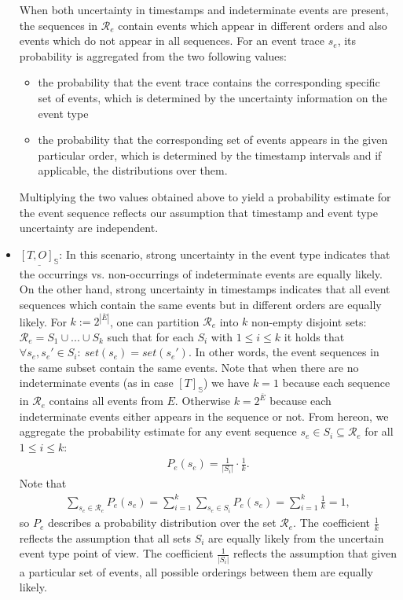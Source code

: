 \begin{itemize}
%
%
%
%
When both uncertainty in timestamps and indeterminate events are present, the sequences in $\mathcal{R}_e$ contain events which appear in different orders and also events which do not appear in all sequences.
For an event trace $s_e$, its probability is aggregated from the two following values:
\begin{itemize}
\item the probability that the event trace contains the corresponding specific set of events, which is determined by the uncertainty information on the event type 
\item the probability that the corresponding set of events appears in the given particular order, which is determined by the timestamp intervals and if applicable, the distributions over them. 
\end{itemize}
Multiplying the two values obtained above to yield a probability estimate for the event sequence reflects our assumption that timestamp and event type uncertainty are independent.


\item
$\underline{[T,O]_{\mathbb{S}}}$:
In this scenario, strong uncertainty in the event type indicates that the occurrings vs. non-occurrings of indeterminate events are equally likely.
On the other hand, strong uncertainty in timestamps indicates that all event sequences which contain the same events but in different orders are equally likely.
For $k:=2^{|\overline{E}|}$, one can partition $\mathcal{R}_e$ into $k$ non-empty disjoint sets: $\mathcal{R}_e = S_1 \cup ... \cup S_k$ such that for each $S_i$ with $1 \leq i \leq k$ it holds that $\forall s_e, s_e' \in S_i: ~ set(s_e) = set(s_e')$.
In other words, the event sequences in the same subset contain the same events.
Note that when there are no indeterminate events (as in case $[T]_{\mathbb{S}}$) we have $k=1$ because each sequence in $\mathcal{R}_e$ contains all events from $E$.
Otherwise $k = 2^{\overline{E}}$ because each indeterminate events either appears in the sequence or not.
From hereon, we aggregate the probability estimate for any event sequence $s_e \in S_i \subseteq \mathcal{R}_e$ for all $1 \leq i \leq k$:
\begin{align*}
P_e(s_e) = \frac{1}{|S_i|} \cdot \frac{1}{k}.
\end{align*}
Note that 
\begin{align*}
\sum_{s_e \in \mathcal{R}_e} P_e(s_e) = \sum_{i=1}^k \sum_{s_e \in S_i} P_e(s_e) = \sum_{i=1}^k \frac{1}{k} = 1,
\end{align*}
so $P_e$ describes a probability distribution over the set $\mathcal{R}_e$.
The coefficient $\frac{1}{k}$ reflects the assumption that all sets $S_i$ are equally likely from the uncertain event type point of view.
The coefficient $\frac{1}{|S_i|}$ reflects the assumption that given a particular set of events, all possible orderings between them are equally likely.


\end{itemize}
